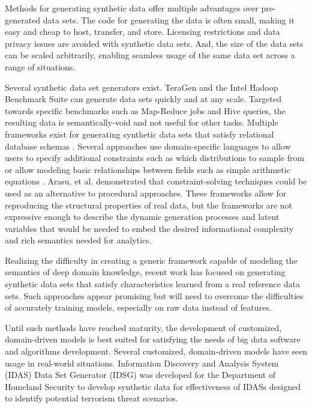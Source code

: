 \documentclass[conference]{IEEEtran}
\begin{document}
Methods for generating synthetic data offer multiple advantages over pre-generated data sets.  The code for generating the data is often small, making it easy and cheap to host, transfer, and store. Licensing restrictions and data privacy issues are avoided with synthetic data sets.  And, the size of the data sets can be scaled arbitrarily, enabling seamless usage of the same data set across a range of situations.  

Several synthetic data set generators exist.  TeraGen and the Intel Hadoop Benchmark Suite \cite{Huang2010} can generate data sets quickly and at any scale. Targeted towards specific benchmarks such as Map-Reduce jobs and Hive queries, the resulting data is semantically-void and not useful for other tasks.  Multiple frameworks exist for generating synthetic data sets that satisfy relational database schemas \cite{Ghazal2013,Rabl2011a,Frank2012,Rabl2011,Gray1994,Bruno2005,Hoag2007}. Several approaches use domain-specific languages \cite{Bruno2005,Hoag2007} to allow users to specify additional constraints such as which distributions to sample from or allow modeling basic relationships between fields such as simple arithmetic equations \cite{Alexandrov2012}. Arasu, et al. \cite{Arasu2011} demonstrated that constraint-solving techniques could be used as an alternative to procedural approaches. These frameworks allow for reproducing the structural properties of real data, but the frameworks are not expressive enough to describe the dynamic generation processes and latent variables that would be needed to embed the desired informational complexity and rich semantics needed for analytics.

Realizing the difficulty in creating a generic framework capable of modeling the semantics of deep domain knowledge, recent work\cite{Alexandrov2013} has focused on generating synthetic data sets that satisfy characteristics learned from a real reference data sets. Such approaches appear promising but will need to overcome the difficulties of accurately training models, especially on raw data instead of features.

Until such methods have reached maturity, the development of customized, domain-driven models is best suited for satisfying the needs of big data software and algorithms development. Several customized, domain-driven models have seen usage in real-world situations.  Information Discovery and Analysis System (IDAS) Data Set Generator (IDSG) \cite{Jeske2005,Lin2006} was developed for the Department of Homeland Security to develop synthetic data for effectiveness of IDASs designed to identify potential terrorism threat scenarios.
\end{document}
